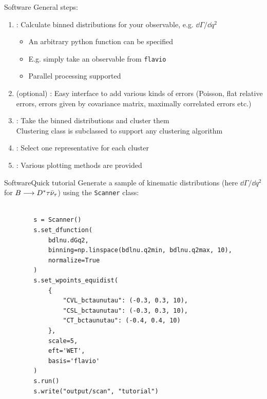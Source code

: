 \begin{frame}{Software}
    General steps:
    \begin{enumerate}
        \item {}: Calculate binned distributions for your observable, e.g. $\dd\Gamma/\dd q^2$
        \begin{itemize}
            \item An arbitrary python function can be specified
            \item E.g. simply take an observable from \texttt{flavio}
            \item Parallel processing supported
        \end{itemize}
        \item (optional) : Easy interface to add various kinds of errors {\footnotesize(Poisson, flat relative errors, errors given by covariance matrix, maximally correlated errors etc.)}
        \item {}: Take the binned distributions and cluster them\\
        {\footnotesize Clustering class is subclassed to support any clustering algorithm}
        \item {}: Select one representative for each cluster
        \item {}: Various plotting methods are provided
    \end{enumerate}
\end{frame}

\begin{frame}[fragile]{Software}{Quick tutorial}
    Generate a sample of kinematic distributions (here $\dd\Gamma/\dd q^2$ for $B\longrightarrow D^*\tau\bar\nu_\tau$) using the \texttt{Scanner} class:
    
    \begin{verbatim}
    
        s = Scanner()
        s.set_dfunction(
            bdlnu.dGq2,
            binning=np.linspace(bdlnu.q2min, bdlnu.q2max, 10),
            normalize=True
        )
        s.set_wpoints_equidist(
            {
                "CVL_bctaunutau": (-0.3, 0.3, 10),
                "CSL_bctaunutau": (-0.3, 0.3, 10),
                "CT_bctaunutau": (-0.4, 0.4, 10)
            },
            scale=5,
            eft='WET',
            basis='flavio'
        )
        s.run()
        s.write("output/scan", "tutorial")
    \end{verbatim}

\end{frame}

